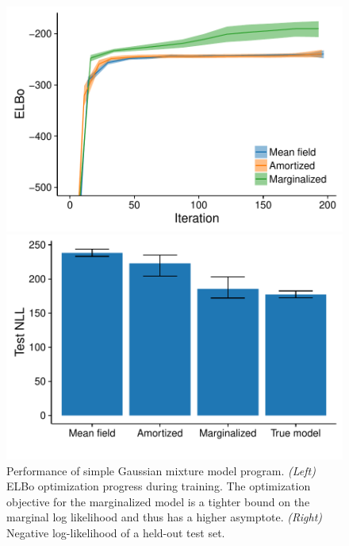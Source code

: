 \begin{figure}[!ht]
\begin{minipage}{0.5\linewidth}
\centering
\includegraphics[width=\linewidth]{figs/results/gmm/elboProgress.pdf}
\end{minipage}
%
\begin{minipage}{0.5\linewidth}
\centering
\includegraphics[width=\linewidth]{figs/results/gmm/nll.pdf}
\end{minipage}
\caption{Performance of simple Gaussian mixture model program. \emph{(Left)} ELBo optimization progress during training. The optimization objective for the marginalized model is a tighter bound on the marginal log likelihood and thus has a higher asymptote. \emph{(Right)} Negative log-likelihood of a held-out test set.}
\label{fig:gmmResults}
\end{figure}


